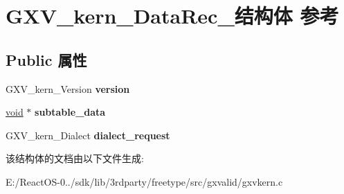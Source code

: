 \hypertarget{struct_g_x_v__kern___data_rec__}{}\section{G\+X\+V\+\_\+kern\+\_\+\+Data\+Rec\+\_\+结构体 参考}
\label{struct_g_x_v__kern___data_rec__}
\subsection*{Public 属性}
\begin{DoxyCompactItemize}
\item 
\mbox{\label{struct_g_x_v__kern___data_rec___acc740e7caa7e114f9ed6bd96138ef78a}} 
G\+X\+V\+\_\+kern\+\_\+\+Version {\bfseries version}
\item 
\mbox{\label{struct_g_x_v__kern___data_rec___ab5dcf10f27a725898ee4a0f686212927}} 
\hyperlink{interfacevoid}{void} $\ast$ {\bfseries subtable\+\_\+data}
\item 
\mbox{\label{struct_g_x_v__kern___data_rec___a5c2f0e725a0656d54578fa5b051bd210}} 
G\+X\+V\+\_\+kern\+\_\+\+Dialect {\bfseries dialect\+\_\+request}
\end{DoxyCompactItemize}


该结构体的文档由以下文件生成\+:\begin{DoxyCompactItemize}
\item 
E\+:/\+React\+O\+S-\/0../sdk/lib/3rdparty/freetype/src/gxvalid/gxvkern.\+c\end{DoxyCompactItemize}
